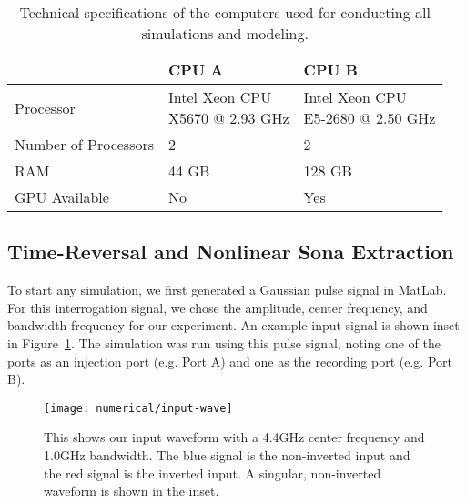 \def\arraystretch{2}
\begin{table}[h]
\centering
\begin{tabular}{|l|l|l|}
\hline
 & \textbf{CPU A} & \textbf{CPU B} \\ \hline
Processor & \rule{0pt}{2.5em}\shortstack{Intel Xeon CPU \\ X5670 @ 2.93 GHz} & \rule{0pt}{2.5em}\shortstack{Intel Xeon CPU \\ E5-2680 @ 2.50 GHz} \\ \hline
Number of Processors & 2 & 2 \\ \hline
RAM & 44 GB & 128 GB \\ \hline
GPU Available & No & Yes \\ \hline
\end{tabular}
\caption[Computer specifications]{Technical specifications of the computers used for conducting all simulations and modeling.}
\label{tab:numerical-cpu-specs}
\end{table}

\subsection{Time-Reversal and Nonlinear Sona Extraction}
To start any simulation, we first generated a Gaussian pulse signal in MatLab. For this interrogation signal, we chose the amplitude, center frequency, and bandwidth frequency for our experiment. An example input signal is shown inset in Figure~\ref{fig:numerical-input-wave}. The simulation was run using this pulse signal, noting one of the ports as an injection port (e.g. Port A) and one as the recording port (e.g. Port B).


\begin{figure}[t]
\centering
\texttt{[image: numerical/input-wave]}
\caption[Example of inverted and non-inverted interrogation signals]{This shows our input waveform with a 4.4GHz center frequency and 1.0GHz bandwidth. The blue signal is the non-inverted input and the red signal is the inverted input. A singular, non-inverted waveform is shown in the inset.}
\label{fig:numerical-input-wave}
\end{figure}

